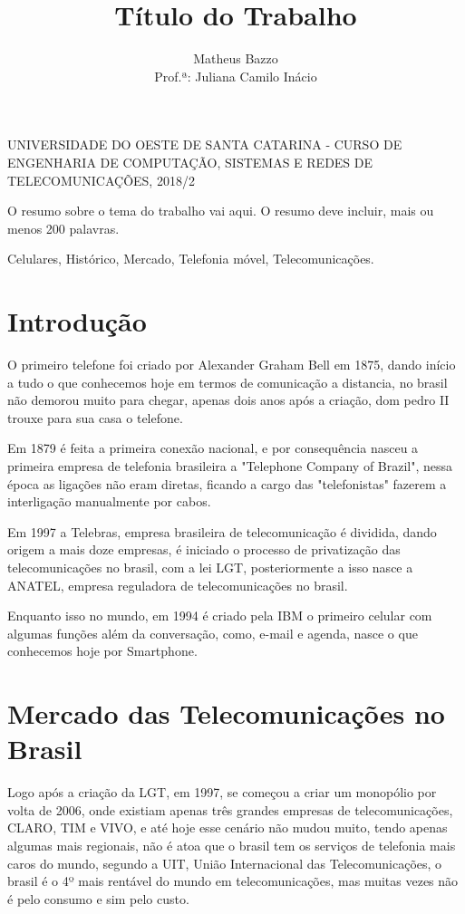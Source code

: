\documentclass{sbrt2018port}
\begin{document}
\title{Título do Trabalho}

\author{ Matheus Bazzo \\
Prof.ª: Juliana Camilo Inácio}

\maketitle

 {UNIVERSIDADE DO OESTE DE SANTA CATARINA - CURSO DE ENGENHARIA DE COMPUTAÇÃO, SISTEMAS E REDES DE TELECOMUNICAÇÕES, 2018/2}

\begin{resumo}
O resumo sobre o tema do trabalho vai aqui. O resumo deve incluir, mais ou menos 200 palavras.
\end{resumo}

\begin{chave}
Celulares, Histórico, Mercado, Telefonia móvel, Telecomunicações.
\end{chave}

\section{Introdução}

O primeiro telefone foi criado por Alexander Graham Bell em 1875, dando início a tudo o que conhecemos hoje em termos de comunicação a distancia, no brasil não demorou muito para chegar, apenas dois anos após a criação, dom pedro II trouxe para sua casa o telefone.

Em 1879 é feita a primeira conexão nacional, e por consequência nasceu a primeira empresa de telefonia brasileira a "Telephone Company of Brazil", nessa época as ligações não eram diretas, ficando a cargo das "telefonistas" fazerem a interligação manualmente por cabos.

Em 1997 a Telebras, empresa brasileira de telecomunicação é dividida, dando origem a mais doze empresas, é iniciado o processo de privatização das telecomunicações no brasil, com a lei LGT, posteriormente a isso nasce a ANATEL, empresa reguladora de telecomunicações no brasil.

Enquanto isso no mundo, em 1994 é criado pela IBM o primeiro celular com algumas funções além da conversação, como, e-mail e agenda, nasce o que conhecemos hoje por Smartphone.

\section{Mercado das Telecomunicações no Brasil}
\label{s_mercadoBrasil}
Logo após a criação da LGT, em 1997, se começou a criar um monopólio por volta de 2006, onde existiam apenas três grandes empresas de telecomunicações, CLARO, TIM e VIVO, e até hoje esse cenário não mudou muito, tendo apenas algumas mais regionais, não é atoa que o brasil tem os serviços de telefonia mais caros do mundo, segundo a UIT, União Internacional das Telecomunicações, o brasil é o 4º mais rentável do mundo em telecomunicações, mas muitas vezes não é pelo consumo e sim pelo custo.
\end{document}
